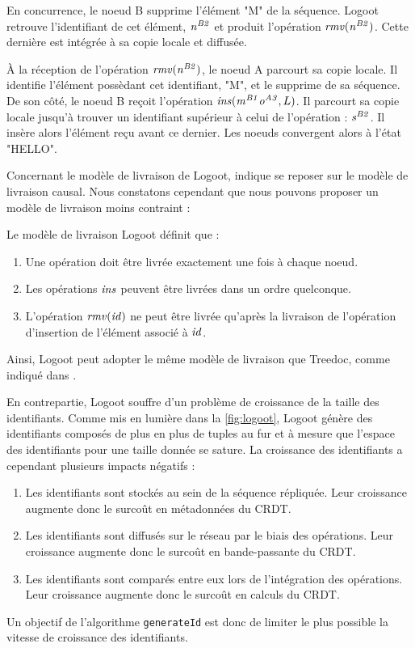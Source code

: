 En concurrence, le noeud B supprime l'élément "M" de la séquence.
Logoot retrouve l'identifiant de cet élément, $\mathit{n}^{\mathit{B2}}_{\mathit{}}$ et produit l'opération $\mathit{rmv}(\mathit{n}^{\mathit{B2}}_{\mathit{}})$.
Cette dernière est intégrée à sa copie locale et diffusée.

À la réception de l'opération $\mathit{rmv}(\mathit{n}^{\mathit{B2}}_{\mathit{}})$, le noeud A parcourt sa copie locale.
Il identifie l'élément possèdant cet identifiant, "M", et le supprime de sa séquence.
De son côté, le noeud B reçoit l'opération $\mathit{ins}(\mathit{m}^{\mathit{B1}}_{\mathit{}}\mathit{o}^{\mathit{A3}}_{\mathit{}}, L)$.
Il parcourt sa copie locale jusqu'à trouver un identifiant supérieur à celui de l'opération : $\mathit{s}^{\mathit{B2}}_{\mathit{}}$.
Il insère alors l'élément reçu avant ce dernier.
Les noeuds convergent alors à l'état "HELLO".

Concernant le modèle de livraison de Logoot, \cite{2009-logoot-weiss} indique se reposer sur le modèle de livraison causal.
Nous constatons cependant que nous pouvons proposer un modèle de livraison moins contraint :
\begin{definition}
  Le modèle de livraison Logoot définit que :
  \begin{enumerate}
    \item Une opération doit être livrée exactement une fois à chaque noeud.
    \item Les opérations $\mathit{ins}$ peuvent être livrées dans un ordre quelconque.
    \item L'opération $\mathit{rmv}(\mathit{id})$ ne peut être livrée qu'après la livraison de l'opération d'insertion de l'élément associé à $\mathit{id}$.
  \end{enumerate}
\end{definition}
Ainsi, Logoot peut adopter le même modèle de livraison que Treedoc, comme indiqué dans \cite{2021-these-vic}.

En contrepartie, Logoot souffre d'un problème de croissance de la taille des identifiants.
Comme mis en lumière dans la \autoref{fig:logoot}, Logoot génère des identifiants composés de plus en plus de tuples au fur et à mesure que l'espace des identifiants pour une taille donnée se sature.
La croissance des identifiants a cependant plusieurs impacts négatifs :
\begin{enumerate}
  \item Les identifiants sont stockés au sein de la séquence répliquée.
    Leur croissance augmente donc le surcoût en métadonnées du \ac{CRDT}.
  \item Les identifiants sont diffusés sur le réseau par le biais des opérations.
    Leur croissance augmente donc le surcoût en bande-passante du \ac{CRDT}.
  \item Les identifiants sont comparés entre eux lors de l'intégration des opérations.
    Leur croissance augmente donc le surcoût en calculs du \ac{CRDT}.
\end{enumerate}
Un objectif de l'algorithme \texttt{generateId} est donc de limiter le plus possible la vitesse de croissance des identifiants.

